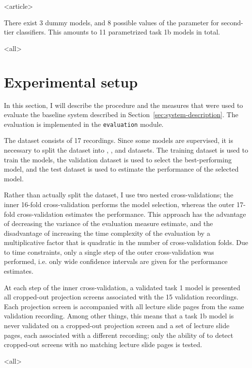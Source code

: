 \mode
<article>

There exist 3 dummy models, and 8 possible values of the parameter for
second-tier classifiers. This amounts to 11 parametrized task 1b models in
total.

\mode
<all>{%
\section{Experimental setup}
\label{sec:experimental-setup}}
In this section, I will describe the procedure and the measures that were used
to evaluate the baseline system described in Section~\ref{sec:system-description}.
The evaluation is implemented in the \texttt{evaluation} module.

The dataset consists of 17 recordings.
Since some models are supervised, it is necessary to split the dataset into
, , and  datasets. The training
dataset is used to train the models, the validation dataset is used to select
the best-performing model, and the test dataset is used to estimate the
performance of the selected model.
    
Rather than actually split the dataset, I use two nested cross-validations; the
inner 16-fold cross-validation performs the model selection, whereas the outer
17-fold cross-validation estimates the performance. This approach has the
advantage of decreasing the variance of the evaluation measure estimate,
and the disadvantage of increasing the time complexity of the evaluation by a
multiplicative factor that is quadratic in the number of cross-validation
folds. Due to time constraints, only a single step of the outer
cross-validation was performed, i.e. only wide confidence intervals
are given for the performance estimates.

At each step of the inner cross-validation, a validated task 1 model is
presented all cropped-out projection screens associated with the 15 validation
recordings. Each projection screen is accompanied with all lecture slide pages
from the same validation recording. Among other things, this means that a task
1b model is never validated on a cropped-out projection screen and a set of
lecture slide pages, each associated with a different recording; only the
ability of to detect cropped-out screens with no matching lecture slide pages
is tested.

\mode
<all>

